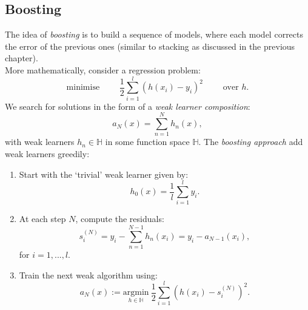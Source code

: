 \subsection{Boosting}
The idea of \textit{boosting} is to build a sequence of models, where each model corrects the error of the previous ones (similar to stacking as discussed in the previous chapter).\\

More mathematically, consider a regression problem:
\begin{equation*}
\text{minimise }\qquad \frac{1}{2} \sum_{i=1}^{l} (h(x_i) - y_i)^2 \qquad \text{ over $h$.}
\end{equation*}
We search for solutions in the form of a \textit{weak learner composition}:
\begin{equation*}
a_N(x) = \sum_{n=1}^{N} h_n(x),
\end{equation*}
with weak learners $h_n \in \mathbb{H}$ in some function space $\mathbb{H}$. The \textit{boosting approach} add weak learners greedily:
\begin{enumerate}[label = (\arabic*)]
\item Start with the `trivial' weak learner given by:
\begin{equation*}
h_0(x) = \frac{1}{l} \sum_{i=1}^{l} y_i.
\end{equation*}
\item At each step $N$, compute the residuals:
\begin{equation*}
s_i^{(N)} = y_i - \sum_{n=1}^{N-1} h_n(x_i) = y_i - a_{N-1}(x_i),
\end{equation*}
for $i = 1,...,l$.
\item Train the next weak algorithm using:
\begin{equation*}
a_N(x) := \underset{h \in \mathbb{H}}{\textrm{argmin}}\ \frac{1}{2} \sum_{i=1}^{l} (h(x_i) - s_i^{(N)})^2.
\end{equation*}
\end{enumerate}




